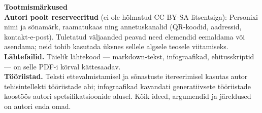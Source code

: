 \clearpage
\thispagestyle{empty}
\begin{flushleft}\small\sffamily
\textbf{Tootmismärkused}\\[1.2em]

\textbf{Autori poolt reserveeritud} (ei ole hõlmatud CC BY-SA litsentsiga): Personixi
nimi ja sõnamärk, raamatukaas ning annetuskanalid (QR-koodid, aadressid,
kontakt-e-post). Tuletatud väljaanded peavad need elemendid eemaldama või asendama;
neid tohib kasutada üksnes sellele algsele teosele viitamiseks.\\[1.2em]

\textbf{Lähtefailid.} Täielik lähtekood --- markdown-tekst, infograafikad,
ehitusskriptid --- on selle PDF-i kõrval kättesaadav.\\[1.2em]

\textbf{Tööriistad.} Teksti ettevalmistamisel ja sõnastuste itereerimisel kasutas
autor tehisintellekti tööriistade abi; infograafikad kavandati generatiivsete
tööriistade koostöös autori spetsifikatsioonide alusel.
Kõik ideed, argumendid ja järeldused on autori enda omad.
\end{flushleft}
\clearpage
